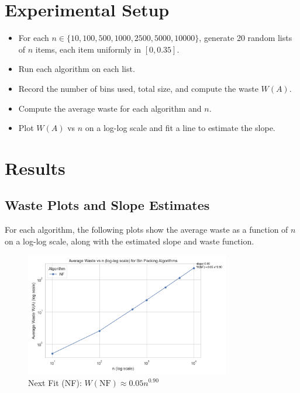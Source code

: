 \documentclass[12pt]{article}
\begin{document}
\section{Experimental Setup}
\begin{itemize}
    \item For each $n \in \{10, 100, 500, 1000, 2500, 5000, 10000\}$, generate 20 random lists of $n$ items, each item uniformly in $[0, 0.35]$.
    \item Run each algorithm on each list.
    \item Record the number of bins used, total size, and compute the waste $W(A)$.
    \item Compute the average waste for each algorithm and $n$.
    \item Plot $W(A)$ vs $n$ on a log-log scale and fit a line to estimate the slope.
\end{itemize}

\section{Results}

\subsection{Waste Plots and Slope Estimates}
For each algorithm, the following plots show the average waste as a function of $n$ on a log-log scale, along with the estimated slope and waste function.

\begin{figure}[h!]
    \centering
    \includegraphics[width=0.8\textwidth]{waste_loglog_NF.png}
    \caption{Next Fit (NF): $W(\text{NF}) \approx 0.05 n^{0.90}$}
\end{figure}
\end{document}
